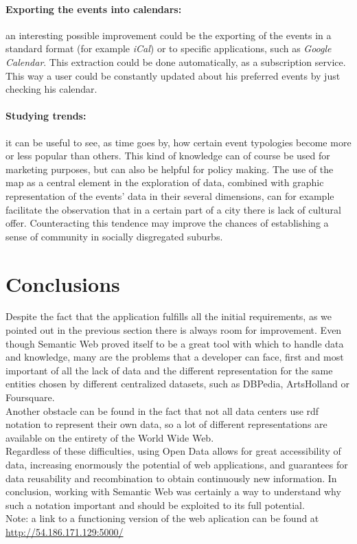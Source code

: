 \documentclass[hidelinks,a4paper]{article}
\begin{document}
\paragraph{Exporting the events into calendars:}
an interesting possible improvement could be the exporting of the events in a standard format (for example \emph{iCal}) or to specific applications, such as \emph{Google Calendar}. This extraction could be done automatically, as a subscription service. This way a user could be
constantly updated about his preferred events by just checking his calendar.

\paragraph{Studying trends:}
it can be useful to see, as time goes by, how certain event typologies become more or less popular than others.
This kind of knowledge can of course be used for marketing purposes, but can also be helpful for policy making. The use of the map as a central element in the exploration of data, combined with graphic representation of the events' data in their several dimensions, can for example facilitate the observation that in a certain part of a city there is lack of cultural offer. Counteracting this tendence may improve the chances of establishing a sense of community in socially disgregated suburbs.


\section{Conclusions}\label{conclusions}
Despite the fact that the application fulfills all the initial requirements, as we pointed out in the previous section there is always room for improvement. Even though Semantic Web proved itself to be a great tool with which to handle data and knowledge, many are the problems that a developer can face, first and most important of all the lack of data and the different representation for the same entities chosen by different centralized datasets, such as DBPedia, ArtsHolland or Foursquare. \\
\indent Another obstacle can be found in the fact that not all data centers use rdf notation to represent their own data, so a lot of different representations are available on the entirety of the World Wide Web. \\
\indent Regardless of these difficulties, using Open Data allows for great accessibility of data, increasing enormously the potential of web applications, and guarantees for data reusability and recombination to obtain continuously new information. In conclusion, working with Semantic Web was certainly a way to understand why such a notation important and should be exploited to its full potential.
\newline \\
Note: a link to a functioning version of the web aplication can be found at \url{http://54.186.171.129:5000/}


\end{document}
